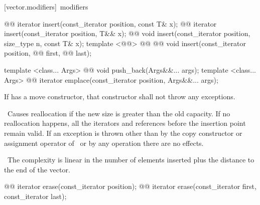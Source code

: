 \documentclass[american,twoside]{book}
\begin{document}
[vector.modifiers]{\ modifiers}

%
\begin{itemdecl}
@@
  iterator insert(const_iterator position, const T& x);
@@
  iterator insert(const_iterator position, T&& x);
@@
  void insert(const_iterator position, size_type n, const T& x);
template <@@>
    @@
          @@
    void insert(const_iterator position,
                @@ first, @@ last);

template <class... Args> 
  @@
  void push_back(Args&&... args);
template <class... Args> 
  @@
  iterator emplace(const_iterator position, Args&&... args);
\end{itemdecl}

\begin{itemdescr}
\pnum
\requires If  has a move constructor, that
constructor shall not throw any exceptions.

\pnum
\notes\ 
Causes reallocation if the new size is greater than the old capacity.
If no reallocation happens, all the iterators and references before the insertion point remain valid.
If an exception is thrown other than by
the copy constructor or assignment operator of
\ or by any  operation
there are no effects.

\pnum
\complexity\ 
The complexity is linear in the number of elements inserted plus the distance
to the end of the vector.
\end{itemdescr}

%
\begin{itemdecl}
@@ iterator erase(const_iterator position);
@@ iterator erase(const_iterator first, const_iterator last);
\end{itemdecl}
\end{document}
